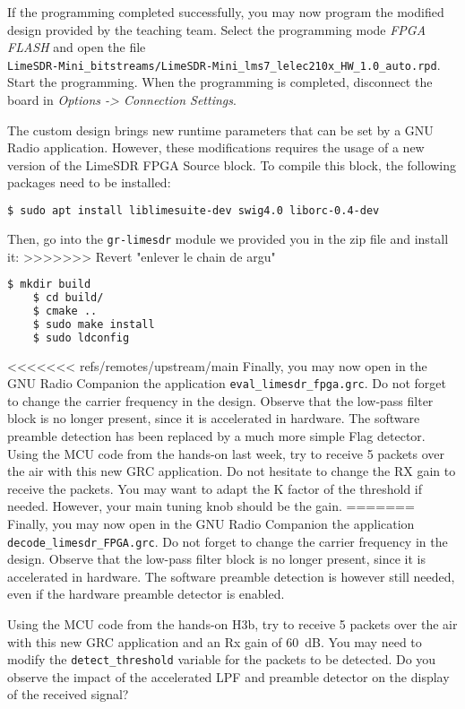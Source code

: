 If the programming completed successfully, you may now program the modified design provided by the teaching team. Select the programming mode \textit{FPGA FLASH} and open the file \\ \texttt{LimeSDR-Mini\_bitstreams/LimeSDR-Mini\_lms7\_lelec210x\_HW\_1.0\_auto.rpd}. Start the programming. When the programming is completed, disconnect the board in \textit{Options -> Connection Settings}.

The custom design brings new runtime parameters that can be set by a GNU Radio application. However, these modifications requires the usage of a new version of the LimeSDR FPGA Source block. To compile this block, the following packages need to be installed:
\begin{lstlisting}[language=bash]
    $ sudo apt install liblimesuite-dev swig4.0 liborc-0.4-dev
\end{lstlisting}
Then, go into the \texttt{gr-limesdr} module we provided you in the zip file and install it:
>>>>>>> Revert "enlever le chain de argu"
\begin{lstlisting}[language=bash]
    $ mkdir build
    $ cd build/
    $ cmake ..
    $ sudo make install
    $ sudo ldconfig
\end{lstlisting}

<<<<<<< refs/remotes/upstream/main
Finally, you may now open in the GNU Radio Companion the application \texttt{eval\_limesdr\_fpga.grc}. Do not forget to change the carrier frequency in the design. Observe that the low-pass filter block is no longer present, since it is accelerated in hardware. The software preamble detection has been replaced by a much more simple Flag detector. Using the MCU code from the hands-on last week, try to receive 5 packets over the air with this new GRC application. Do not hesitate to change the RX gain to receive the packets. You may want to adapt the K factor of the threshold if needed. However, your main tuning knob should be the gain.
=======
Finally, you may now open in the GNU Radio Companion the application \texttt{decode\_limesdr\_FPGA.grc}. Do not forget to change the carrier frequency in the design. Observe that the low-pass filter block is no longer present, since it is accelerated in hardware. The software preamble detection is however still needed, even if the hardware preamble detector is enabled.

Using the MCU code from the hands-on H3b, try to receive 5 packets over the air with this new GRC application and an Rx gain of 60~dB. You may need to modify the \texttt{detect\_threshold} variable for the packets to be detected. Do you observe the impact of the accelerated LPF and preamble detector on the display of the received signal?

